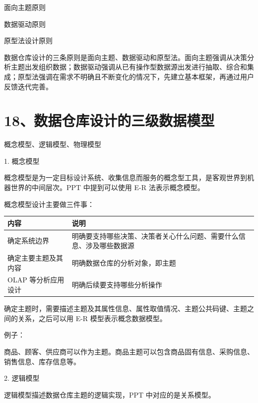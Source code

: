 \documentclass[UTF8,zihao=-4]{ctexart}
\begin{document}
面向主题原则\par
数据驱动原则\par
原型法设计原则\par

数据仓库设计的三条原则是面向主题、数据驱动和原型法。面向主题强调从决策分析主题出发组织数据；数据驱动强调从已有操作型数据源出发进行抽取、综合和集成；原型法强调在需求不明确且不断变化的情况下，先建立基本框架，再通过用户反馈迭代完善。\par

\newpage
\section*{18、数据仓库设计的三级数据模型}

概念模型、逻辑模型、物理模型\par

1. 概念模型\par

概念模型是为一定目标设计系统、收集信息而服务的概念型工具，是客观世界到机器世界的中间层次。PPT 中提到可以使用 E-R 法表示概念模型。\par

概念模型设计主要做三件事：\par

\begin{tabularx}{\linewidth}{|*{2}{>{\RaggedRight\arraybackslash}X|}}
\hline
内容 & 说明 \\
\hline
确定系统边界 & 明确要支持哪些决策、决策者关心什么问题、需要什么信息、涉及哪些数据源 \\
\hline
确定主要主题及其内容 & 明确数据仓库的分析对象，即主题 \\
\hline
OLAP 等分析应用设计 & 明确后续要支持哪些分析操作 \\
\hline
\end{tabularx}

确定主题时，需要描述主题及其属性信息、属性取值情况、主题公共码键、主题之间的关系，之后可以用 E-R 模型表示概念数据模型。\par

例子：\par
商品、顾客、供应商可以作为主题。商品主题可以包含商品固有信息、采购信息、销售信息、库存信息等。\par

2. 逻辑模型\par

逻辑模型描述数据仓库主题的逻辑实现，PPT 中对应的是关系模型。\par
\end{document}
